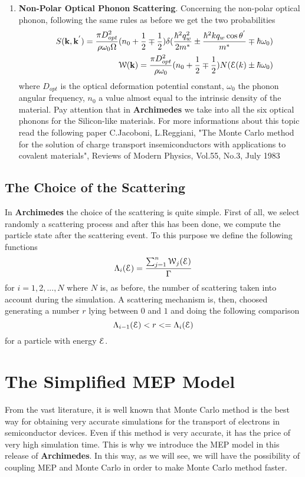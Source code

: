 \documentclass[12pt]{book}
\begin{document}
\begin{enumerate}
\item
\textbf{Non-Polar Optical Phonon Scattering}.
Concerning the non-polar optical phonon, following the same rules as before we get the two probabilities
\begin{eqnarray}
& & S({\bf{k}},{\bf{k}}^{'}) = \frac{\pi D_{opt}^2}{\rho \omega_0 \Omega}
   (n_0 +\frac{1}{2} \mp \frac{1}{2}) \delta (\frac{\hbar^2 q_w^2}{2 m^*} \pm \frac{\hbar^2 k q_w \cos \theta^{'}}{m^*} \mp \hbar \omega_0)\\
& & {\cal{W}} ({\bf{k}}) = \frac{\pi D_{opt}^2}{\rho \omega_0} (n_0 + \frac{1}{2} \mp \frac{1}{2}) N({\cal{E}}(k) \pm \hbar \omega_0)
\end{eqnarray}
where $D_{opt}$ is the optical deformation potential constant, $\omega_0$ the phonon angular frequency, $n_0$ a value almost equal to the intrinsic density of the material. Pay attention that in \textbf{Archimedes} we take into all the six optical phonons for the Silicon-like materials. For more informations about this topic read the following paper
C.Jacoboni, L.Reggiani, "The Monte Carlo method for the solution of charge transport insemiconductors with applications to covalent materials", Reviews of Modern Physics, Vol.55, No.3, July 1983

\end{enumerate}

\subsection{The Choice of the Scattering}
In \textbf{Archimedes} the choice of the scattering is quite simple. First of all, we select randomly a scattering process and after this has been done, we compute the particle state after the scattering event. To this purpose we define the following functions 
\begin{equation}
 \Lambda_i ({\cal E}) = \frac{\sum_{j=1}^n {\cal W}_j ({\cal E})}{\Gamma}
\end{equation}
for $i=1,2,...,N$ where $N$ is, as before, the number of scattering taken into account during the simulation. A scattering mechanism is, then, choosed generating a number $r$ lying between $0$ and $1$ and doing the following comparison
\begin{equation}
 \Lambda_{i-1} ({\cal E}) < r <= \Lambda_i ({\cal E})
\end{equation}
for a particle with energy $\cal E$.

\section{The Simplified MEP Model}
From the vast literature, it is well known that Monte Carlo method is the best way for obtaining very accurate simulations for the transport of electrons in semiconductor devices. Even if this method is very accurate, it has the price of very high simulation time. This is why we introduce the MEP model in this release of \textbf{Archimedes}. In this way, as we will see, we will have the possibility of coupling MEP and Monte Carlo in order to make Monte Carlo method faster.
\end{document}

